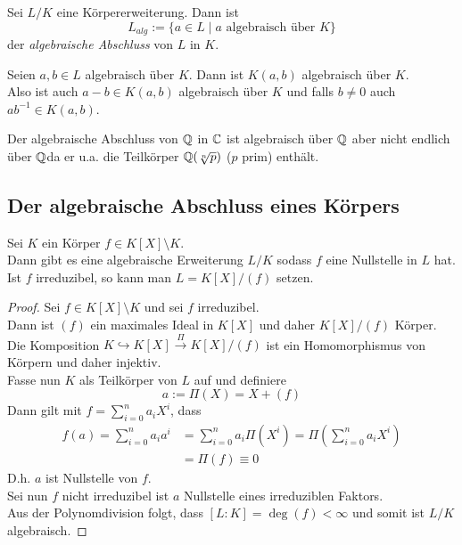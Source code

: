 	\begin{definition}
		Sei $L/K$ eine Körpererweiterung. Dann ist
		\[L_{alg}:=\{a\in L\mid\text{$a$ algebraisch über $K$}\}\]
		der \emph{algebraische Abschluss} von $L$ in $K$.
	\end{definition}

	\begin{kor}
		Seien $a,b\in L$ algebraisch über $K$. Dann ist $K(a,b)$ algebraisch über $K$.\\
		Also ist auch $a-b\in K(a,b)$ algebraisch über $K$ und falls $b\neq0$ auch $ab^{-1}\in K(a,b)$.
	\end{kor}

	\begin{exm}
		Der algebraische Abschluss von $\mathbb{Q}$ in $\mathbb{C}$ ist algebraisch über $\mathbb{Q}$ aber nicht endlich über $\mathbb{Q}$da er u.a. die Teilkörper $\mathbb{Q}(\sqrt[n]{p})$ ($p$ prim) enthält.
	\end{exm}





	\subsection{Der algebraische Abschluss eines Körpers}
	
	\begin{satz}
		Sei $K$ ein Körper $f\in K[X]\setminus K$.\\
		Dann gibt es eine algebraische Erweiterung $L/K$ sodass $f$ eine Nullstelle in $L$ hat.\\
		Ist $f$ irreduzibel, so kann man $L=K[X]/(f)$ setzen.
	\end{satz}
	\begin{proof}
		Sei $f\in K[X]\setminus K$ und sei $f$ irreduzibel.\\
		Dann ist $(f)$ ein maximales Ideal in $K[X]$ und daher $K[X]/(f)$ Körper.\\
		Die Komposition $K\hookrightarrow K[X]\xrightarrow{\Pi} K[X]/(f)$ ist ein Homomorphismus von Körpern und daher injektiv.\\
		Fasse nun $K$ als Teilkörper von $L$ auf und definiere
		\[a:=\Pi(X)=X+(f)\]
		Dann gilt mit $f=\sum_{i=0}^{n}a_iX^i$, dass
		\begin{align*}
		f(a)=\sum_{i=0}^{n}a_ia^i&=\sum_{i=0}^{n}a_i\Pi(X^i)=\Pi\left(\sum_{i=0}^{n}a_iX^i\right)\\
		&=\Pi(f)\equiv 0
		\end{align*}
		D.h. $a$ ist Nullstelle von $f$.\\
		Sei nun $f$ nicht irreduzibel ist $a$ Nullstelle eines irreduziblen Faktors.\\
		Aus der Polynomdivision folgt, dass $[L:K]=\deg(f)<\infty$ und somit ist $L/K$ algebraisch.
	\end{proof}

